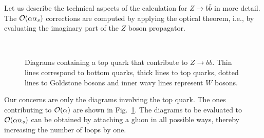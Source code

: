 Let us describe the technical aspects of the calculation for $Z\to b
\bar b$ in more detail. The ${\cal O}(\alpha\alpha_s)$ corrections are
computed by applying the optical theorem, i.e., by evaluating the
imaginary part of the $Z$ boson propagator.
%
\begin{figure}[t]
  \begin{center}
    \leavevmode 
    \\
    \parbox{\captionwidth}{
      \caption[]{\label{fig::zbbdias}Diagrams containing a top quark that 
        contribute to $Z\to b\bar b$. Thin lines correspond to bottom
        quarks, thick lines to top quarks, dotted lines to Goldstone
        bosons and inner wavy lines represent $W$ bosons.}}
  \end{center}
\end{figure}
%
Our concerns are only the diagrams involving the top quark.  The ones
contributing to ${\cal O}(\alpha)$ are shown in Fig.~\ref{fig::zbbdias}.
The diagrams to be evaluated to ${\cal O}(\alpha\alpha_s)$ can be
obtained by attaching a gluon in all possible ways, thereby increasing
the number of loops by one.

